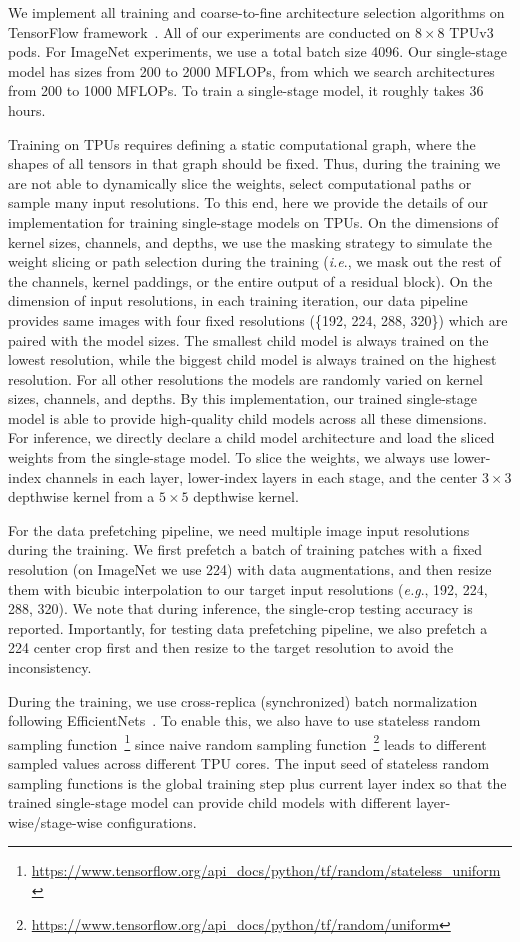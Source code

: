 \documentclass[runningheads]{llncs}
\def\onedot{.}
\def\eg{\emph{e.g}\onedot} \def\Eg{\emph{E.g}\onedot}
\def\ie{\emph{i.e}\onedot} \def\Ie{\emph{I.e}\onedot}
\begin{document}
We implement all training and coarse-to-fine architecture selection algorithms on TensorFlow framework~\cite{tensorflow2015-whitepaper}. All of our experiments are conducted on \(8 \times 8\) TPUv3 pods. For ImageNet experiments, we use a total batch size 4096. Our single-stage model has sizes from 200 to 2000 MFLOPs, from which we search architectures from 200 to 1000 MFLOPs. To train a single-stage model, it roughly takes 36 hours.

Training on TPUs requires defining a static computational graph, where the shapes of all tensors in that graph should be fixed. Thus, during the training we are not able to dynamically slice the weights, select computational paths or sample many input resolutions. To this end, here we provide the details of our implementation for training single-stage models on TPUs. On the dimensions of kernel sizes, channels, and depths, we use the masking strategy to simulate the weight slicing or path selection during the training (\ie, we mask out the rest of the channels, kernel paddings, or the entire output of a residual block). On the dimension of input resolutions, in each training iteration, our data pipeline provides same images with four fixed resolutions (\{192, 224, 288, 320\}) which are paired with the model sizes. The smallest child model is always trained on the lowest resolution, while the biggest child model is always trained on the highest resolution. For all other resolutions the models are randomly varied on kernel sizes, channels, and depths. By this implementation, our trained single-stage model is able to provide high-quality child models across all these dimensions. For inference, we directly declare a child model architecture and load the sliced weights from the single-stage model. To slice the weights, we always use lower-index channels in each layer, lower-index layers in each stage, and the center \(3 \times 3\) depthwise kernel from a \(5 \times 5\) depthwise kernel.

For the data prefetching pipeline, we need multiple image input resolutions during the training. We first prefetch a batch of training patches with a fixed resolution (on ImageNet we use 224) with data augmentations, and then resize them with bicubic interpolation to our target input resolutions (\eg, 192, 224, 288, 320). We note that during inference, the single-crop testing accuracy is reported. Importantly, for testing data prefetching pipeline, we also prefetch a 224 center crop first and then resize to the target resolution to avoid the inconsistency.

During the training, we use cross-replica (synchronized) batch normalization following EfficientNets~\cite{tan2019efficientnet}. To enable this, we also have to use stateless random sampling function~\footnote{\url{https://www.tensorflow.org/api_docs/python/tf/random/stateless_uniform}} since naive random sampling function~\footnote{\url{https://www.tensorflow.org/api_docs/python/tf/random/uniform}} leads to different sampled values across different TPU cores. The input seed of stateless random sampling functions is the global training step plus current layer index so that the trained single-stage model can provide child models with different layer-wise/stage-wise configurations.

  
\end{document}
